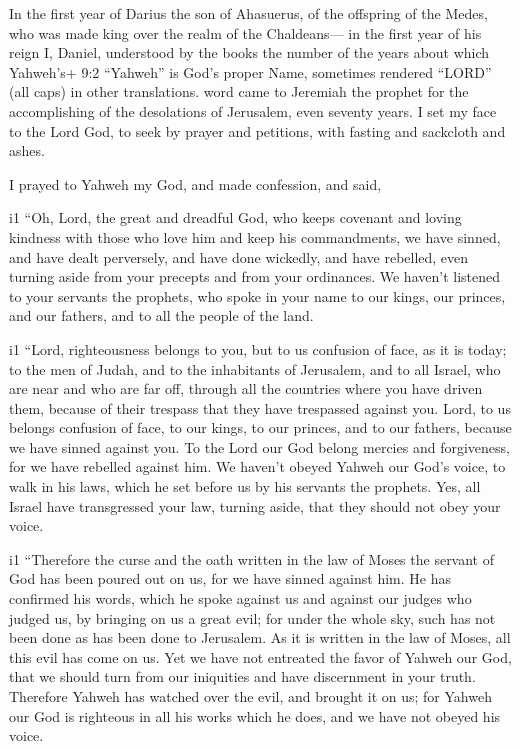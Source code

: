  In the first year of Darius the son of Ahasuerus, of the
offspring of the Medes, who was made king over the realm of the
Chaldeans---  in the first year of his reign I, Daniel,
understood by the books the number of the years about which Yahweh's+
9:2 ``Yahweh'' is God's proper Name, sometimes rendered ``LORD'' (all
caps) in other translations. word came to Jeremiah the prophet for the
accomplishing of the desolations of Jerusalem, even seventy years.
 I set my face to the Lord God, to seek by prayer and
petitions, with fasting and sackcloth and ashes.

 I prayed to Yahweh my God, and made confession, and said,

i1 ``Oh, Lord, the great and dreadful God, who keeps covenant and loving
kindness with those who love him and keep his commandments, 
we have sinned, and have dealt perversely, and have done wickedly, and
have rebelled, even turning aside from your precepts and from your
ordinances.  We haven't listened to your servants the
prophets, who spoke in your name to our kings, our princes, and our
fathers, and to all the people of the land.

i1 ``Lord, righteousness belongs to you, but to us confusion
of face, as it is today; to the men of Judah, and to the inhabitants of
Jerusalem, and to all Israel, who are near and who are far off, through
all the countries where you have driven them, because of their trespass
that they have trespassed against you.  Lord, to us belongs
confusion of face, to our kings, to our princes, and to our fathers,
because we have sinned against you.  To the Lord our God
belong mercies and forgiveness, for we have rebelled against him.
 We haven't obeyed Yahweh our God's voice, to walk in his
laws, which he set before us by his servants the prophets. 
Yes, all Israel have transgressed your law, turning aside, that they
should not obey your voice.

i1 ``Therefore the curse and the oath written in the law of Moses the
servant of God has been poured out on us, for we have sinned against
him.  He has confirmed his words, which he spoke against us
and against our judges who judged us, by bringing on us a great evil;
for under the whole sky, such has not been done as has been done to
Jerusalem.  As it is written in the law of Moses, all this
evil has come on us. Yet we have not entreated the favor of Yahweh our
God, that we should turn from our iniquities and have discernment in
your truth.  Therefore Yahweh has watched over the evil,
and brought it on us; for Yahweh our God is righteous in all his works
which he does, and we have not obeyed his voice.

